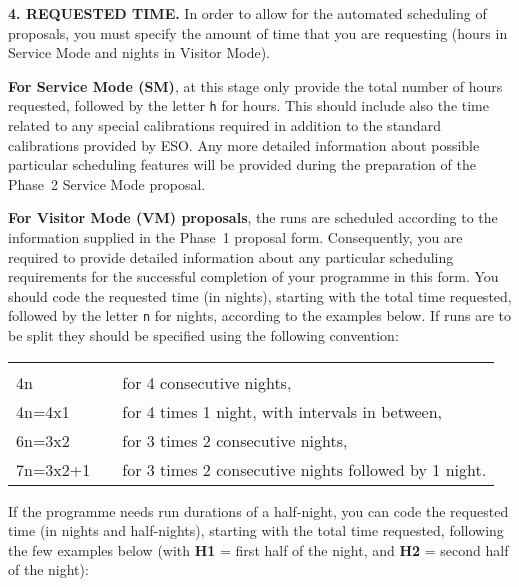 \documentclass{article}
\begin{document}
\medskip

{\bf 4.  REQUESTED TIME.}  In order to allow for the automated
scheduling of proposals, you must specify the amount of time 
that you are requesting (hours in Service Mode and nights in Visitor
Mode). 

\smallskip

{\bf For Service Mode (SM)}, at this stage only provide the total
number of hours requested, followed by the letter \verb|h| for hours.
This should include also the time related to any special calibrations
required in addition to the standard calibrations provided by ESO.
Any more detailed information about possible particular scheduling
features will be provided during the preparation of the Phase~2
Service Mode proposal.

\smallskip

{\bf For Visitor Mode (VM) proposals}, the runs are scheduled
according to the information supplied in the Phase~1 proposal
form.  Consequently, you are required to provide detailed information 
about any particular scheduling requirements for the successful 
completion of your programme in this form.  You
should code the requested time (in nights), starting with the total
time requested, followed by the letter \verb|n| for nights, according
to the examples below.
If runs are to be split they should be specified using the following
convention:

\begin{tabular}{ll}
& \\
4n          & for 4 consecutive nights, \\
4n=4x1      & for 4 times 1 night, with intervals in between,\\
6n=3x2      & for 3 times 2 consecutive nights, \\
7n=3x2+1 \,\,\,\, & for 3 times 2 consecutive nights followed by 1 night. \\
\end{tabular}

\bigskip

If the programme needs run durations of a half-night, you can code the
requested time (in nights and half-nights), starting with the total
time requested, following the few examples below (with {\bf H1} =
first half of the night, and {\bf H2} = second half of the night):
\end{document}
